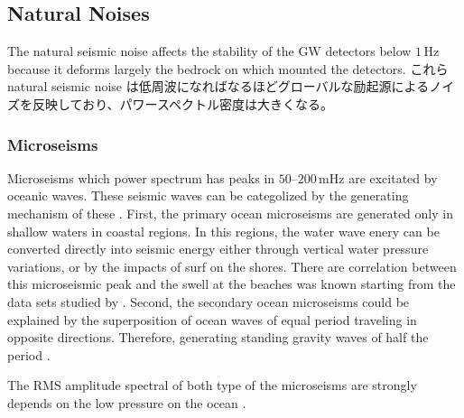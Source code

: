 \subsection{Natural Noises} \label{sec:322}
The natural seismic noise affects the stability of the GW detectors below $1\,\mathrm{Hz}$ because it deforms largely the bedrock on which mounted the detectors. これらnatural seismic noise は低周波になればなるほどグローバルな励起源によるノイズを反映しており、パワースペクトル密度は大きくなる。

\subsubsection{Microseisms}
Microseisms which power spectrum has peaks in $50$--$200\,\mathrm{mHz}$ are excitated by oceanic waves. These seismic waves can be categolized by the generating mechanism of these \cite{Bormann2012new}. First, the primary ocean microseisms are generated only in shallow waters in coastal regions. In this regions, the water wave enery can be converted directly into seismic energy either through vertical water pressure variations, or by the impacts of surf on the shores. There are correlation between this microseismic peak and the swell at the beaches was known starting from the data sets studied by \cite{haubrich1963comparative}. Second, the secondary ocean microseisms could be explained by the superposition of ocean waves of equal period traveling in opposite directions. Therefore, generating standing gravity waves of half the period \cite{longuet1950theory}.

The RMS amplitude spectral of both type of the microseisms are strongly depends on the low pressure on the ocean \cite{naticchioni2014microseismic}.

